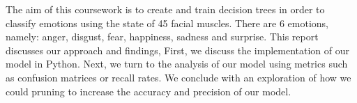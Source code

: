 The aim of this coursework is to create and train decision trees in order to classify emotions using the state of 45 facial muscles.
There are 6 emotions, namely: anger, disgust, fear, happiness, sadness and surprise.
This report discusses our approach and findings, 
First,  we discuss the implementation of our model in Python.
Next, we turn to the analysis of our model using metrics such as confusion matrices or recall rates.
We conclude with an exploration of how we could pruning to increase the accuracy and precision of our model.

